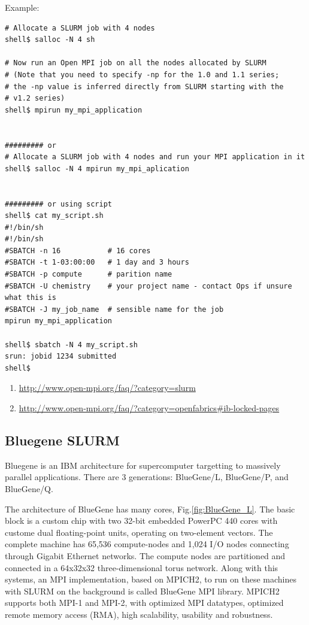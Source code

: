 Example:
\begin{verbatim}
# Allocate a SLURM job with 4 nodes
shell$ salloc -N 4 sh

# Now run an Open MPI job on all the nodes allocated by SLURM
# (Note that you need to specify -np for the 1.0 and 1.1 series;
# the -np value is inferred directly from SLURM starting with the 
# v1.2 series)
shell$ mpirun my_mpi_application


######### or
# Allocate a SLURM job with 4 nodes and run your MPI application in it
shell$ salloc -N 4 mpirun my_mpi_aplication


######### or using script
shell$ cat my_script.sh
#!/bin/sh
#!/bin/sh
#SBATCH -n 16           # 16 cores
#SBATCH -t 1-03:00:00   # 1 day and 3 hours
#SBATCH -p compute      # parition name
#SBATCH -U chemistry    # your project name - contact Ops if unsure what this is
#SBATCH -J my_job_name  # sensible name for the job
mpirun my_mpi_application

shell$ sbatch -N 4 my_script.sh
srun: jobid 1234 submitted
shell$
\end{verbatim}


\begin{enumerate}
  \item \url{http://www.open-mpi.org/faq/?category=slurm}
  \item \url{http://www.open-mpi.org/faq/?category=openfabrics#ib-locked-pages}
\end{enumerate} 

\subsection{Bluegene SLURM}

Bluegene is an IBM architecture for supercomputer targetting to
massively parallel applications. There are 3 generations: BlueGene/L,
BlueGene/P, and BlueGene/Q.

The architecture of BlueGene has many cores, Fig.\ref{fig:BlueGene_L}. The basic
block is a custom chip with two 32-bit embedded PowerPC 440 cores with custome
dual floating-point units, operating on two-element vectors. The complete
machine has 65,536 compute-nodes and 1,024 I/O nodes connecting through Gigabit
Ethernet networks. The compute nodes are partitioned and connected in a 64x32x32
three-dimensional torus network. Along with this systems, an MPI implementation,
based on MPICH2, to run on these machines with SLURM on the background is called
BlueGene MPI library. MPICH2 supports both MPI-1 and MPI-2, with optimized MPI
datatypes, optimized remote memory access (RMA), high scalability, usability and
robustness.


